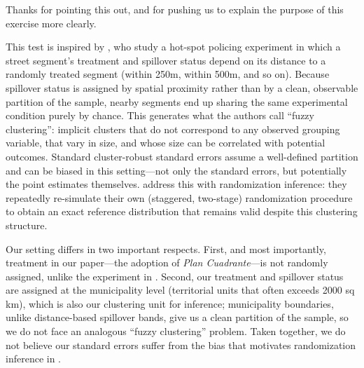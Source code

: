 
Thanks for pointing this out, and for pushing us to explain the purpose of this exercise more clearly.

This test is inspired by \citet{Blattman_Tobon_JEEA}, who study a hot-spot policing experiment in which a street segment's treatment and spillover status depend on its distance to a randomly treated segment (within 250m, within 500m, and so on). Because spillover status is assigned by spatial proximity rather than by a clean, observable partition of the sample, nearby segments end up sharing the same experimental condition purely by chance. This generates what the authors call ``fuzzy clustering'': implicit clusters that do not correspond to any observed grouping variable, that vary in size, and whose size can be correlated with potential outcomes. Standard cluster-robust standard errors assume a well-defined partition and can be biased in this setting---not only the standard errors, but potentially the point estimates themselves. \citet{Blattman_Tobon_JEEA} address this with randomization inference: they repeatedly re-simulate their own (staggered, two-stage) randomization procedure to obtain an exact reference distribution that remains valid despite this clustering structure.

Our setting differs in two important respects. First, and most importantly, treatment in our paper---the adoption of \emph{Plan Cuadrante}---is not randomly assigned, unlike the experiment in \citet{Blattman_Tobon_JEEA}. Second, our treatment and spillover status are assigned at the municipality level (territorial units that often exceeds 2000 sq km), which is also our clustering unit for inference; municipality boundaries, unlike distance-based spillover bands, give us a clean partition of the sample, so we do not face an analogous ``fuzzy clustering'' problem. Taken together, we do not believe our standard errors suffer from the bias that motivates randomization inference in \citet{Blattman_Tobon_JEEA}.

